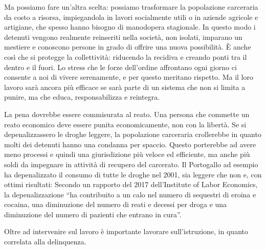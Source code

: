 \documentclass[12pt]{book} %
\begin{document}
Ma possiamo fare un’altra scelta: possiamo trasformare la popolazione carceraria da costo a risorsa, impiegandola in lavori socialmente utili o in aziende agricole e artigiane, che spesso hanno bisogno di manodopera stagionale. In questo modo i detenuti vengono realmente reinseriti nella società, non isolati, imparano un mestiere e conoscono persone in grado di offrire una nuova possibilità.
È anche così che si protegge la collettività: riducendo la recidiva e creando ponti tra il dentro e il fuori. Lo stress che le forze dell’ordine affrontano ogni giorno ci consente a noi di vivere serenamente, e per questo meritano rispetto. Ma il loro lavoro sarà ancora più efficace se sarà parte di un sistema che non si limita a punire, ma che educa, responsabilizza e reintegra.

La pena dovrebbe essere commisurata al reato. Una persona
che commette un reato economico deve essere punita economicamente, non con la libertà.
Se si depenalizzassero le droghe leggere, la popolazione carceraria crollerebbe in quanto molti dei detenuti
hanno una condanna per spaccio. Questo porterebbe ad avere meno processi e quindi una giurisdizione più veloce ed efficiente,
ma anche più soldi da impegnare in attività di recupero del carcerato. Il Portogallo ad esempio ha depenalizzato il
consumo di tutte le droghe nel 2001, sia leggere che non e, con ottimi risultati: Secondo un rapporto del 2017
dell'Institute of Labor
Economics, la depenalizzazione “ha contribuito a un calo nel numero di sequestri di eroina e cocaina, una diminuzione del
numero di reati e decessi per droga e una diminuzione del numero di pazienti che entrano in cura”. 

Oltre ad intervenire sul lavoro è importante lavorare sull'istruzione, in quanto correlata alla delinquenza.
\end{document}
